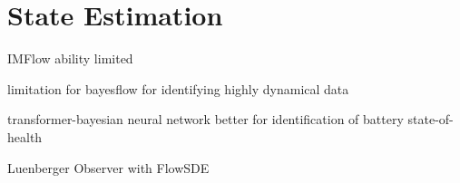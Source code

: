 \section{State Estimation}
\label{sec:methods:state_estimation}

IMFlow ability limited

limitation for bayesflow for identifying highly dynamical data

transformer-bayesian neural network
better for identification of battery state-of-health

Luenberger Observer with FlowSDE

